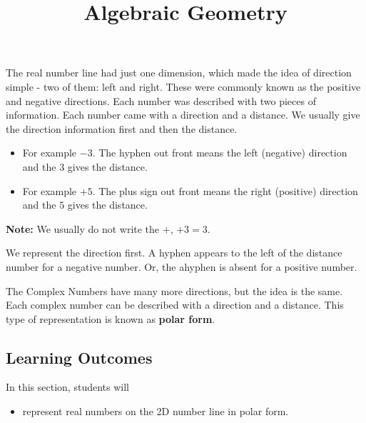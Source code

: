 \documentclass{ximera}
\title{Algebraic Geometry}
\begin{document}
\begin{abstract}
\end{abstract}
\maketitle





The real number line had just one dimension, which made the idea of direction simple - two of them: left and right.  These were commonly known as the positive and negative directions.  Each number was described with two pieces of information.  Each number came with a direction and a distance.  We usually give the direction information first and then the distance.


\begin{itemize}
\item For example $-3$.  The hyphen out front means the left (negative) direction and the $3$ gives the distance.
\item For example $+5$.  The plus sign out front means the right (positive) direction and the $5$ gives the distance.
\end{itemize}
\textbf{Note:} We usually do not write the $+$, $+3 = 3$.

We represent the direction first.  A hyphen appears to the left of the distance number for a negative number. Or, the ahyphen is absent for a positive number.

The Complex Numbers have many more directions, but the idea is the same.  Each complex number can be described with a direction and a distance.  This type of representation is known as \textbf{polar form}.






\subsection{Learning Outcomes}



\begin{sectionOutcomes}
In this section, students will 

\begin{itemize}
\item represent real numbers on the 2D number line in polar form.
\end{itemize}
\end{sectionOutcomes}
\end{document}
